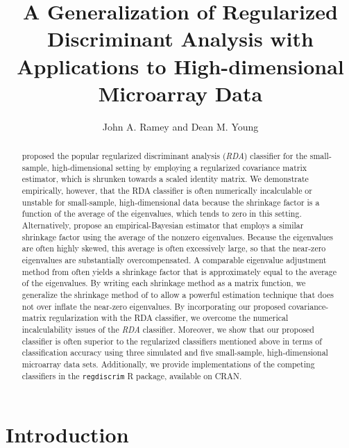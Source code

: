 \documentclass[11pt]{article}
\title{A Generalization of Regularized Discriminant Analysis with Applications to High-dimensional Microarray Data}
\author{John A. Ramey and Dean M. Young}
\begin{document}
\newtheorem*{thm}{Theorem}
\newtheorem*{cor}{Corollary}


\doublespacing

\maketitle



\begin{abstract}
\cite{Friedman:1989tm} proposed the popular regularized discriminant analysis (\emph{RDA}) classifier for the small-sample, high-dimensional setting by employing a regularized covariance matrix estimator, which is shrunken towards a scaled identity matrix. We demonstrate empirically, however, that the RDA classifier is often numerically incalculable or unstable for small-sample, high-dimensional data because the shrinkage factor is a function of the average of the eigenvalues, which tends to zero in this setting. Alternatively, \cite{Srivastava:2007ww} propose an empirical-Bayesian estimator that employs a similar shrinkage factor using the average of the nonzero eigenvalues.  Because the eigenvalues are often highly skewed, this average is often excessively large, so that the near-zero eigenvalues are substantially overcompensated. A comparable eigenvalue adjustment method from \cite{Thomaz:2006ef} often yields a shrinkage factor that is approximately equal to the average of the eigenvalues. By writing each shrinkage method as a matrix function, we generalize the shrinkage method of \cite{Thomaz:2006ef} to allow a powerful estimation technique that does not over inflate the near-zero eigenvalues. By incorporating our proposed covariance-matrix regularization with the RDA classifier, we overcome the numerical incalculability issues of the \emph{RDA} classifier. Moreover, we show that our proposed classifier is often superior to the regularized classifiers mentioned above in terms of classification accuracy using three simulated and five small-sample, high-dimensional microarray data sets. Additionally, we provide implementations of the competing classifiers in the {\tt regdiscrim} R package, available on CRAN.
\end{abstract}

\section{Introduction}
\end{document}
